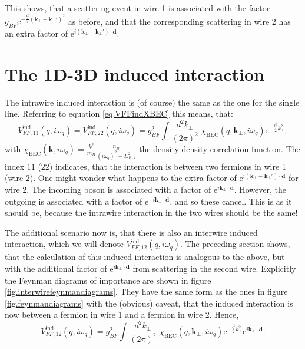This shows, that a scattering event in wire 1 is associated with the factor $g_{BF} \text{e}^{-\frac{l_t^2}{4}(\mathbf{k}_\perp - \mathbf{k}_\perp')^2}$ as before, and that the corresponding scattering in wire 2 has an extra factor of $\text{e}^{i(\mathbf{k}_\perp - \mathbf{k}_\perp')\cdot \mathbf{d}}$. 

\section{The 1D-3D induced interaction}
The intrawire induced interaction is (of course) the same as the one for the single line. Referring to equation \ref{eq.VFFindXBEC} this means, that:
\begin{equation}
V_{FF,11}^\text{ind}(q,i\omega_q) = V_{FF,22}^\text{ind}(q,i\omega_q) = g_{BF}^2\int\frac{d^2k_\perp}{(2\pi)^2}\; \chi_\text{BEC}(q,\mathbf{k}_\perp,i\omega_q)\text{e}^{-\frac{l_t^2}{2}k_\perp^2}, 
\label{eq.VFF1122indXBEC} 
\end{equation}
with $\chi_\text{BEC}(\mathbf{k},i\omega_q) = \frac{k^2}{m_B}\frac{n_B}{(i\omega_q)^2-E_{B,k}^2}$ the density-density correlation function. The index $11$ ($22$) indicates, that the interaction is between two fermions in wire 1 (wire 2). One might wonder what happens to the extra factor of $\text{e}^{i(\mathbf{k}_\perp - \mathbf{k}_\perp')\cdot \mathbf{d}}$ for wire 2. The incoming boson is associated with a factor of $\text{e}^{i\mathbf{k}_\perp\cdot \mathbf{d}}$. However, the outgoing is associated with a factor of $\text{e}^{-i\mathbf{k}_\perp\cdot \mathbf{d}}$, and so these cancel. This is as it should be, because the intrawire interaction in the two wires should be the same!

The additional scenario now is, that there is also an interwire induced interaction, which we will denote $V_{FF,12}^\text{ind}(q,i\omega_q)$. The preceding section shows, that the calculation of this induced interaction is analogous to the above, but with the additional factor of $\text{e}^{i\mathbf{k}_\perp\cdot \mathbf{d}}$ from scattering in the second wire. Explicitly the Feynman diagrams of importance are shown in figure \ref{fig.interwirefeynmandiagrams}. They have the same form as the ones in figure \ref{fig.feynmandiagrams} with the (obvious) caveat, that the induced interaction is now between a fermion in wire 1 and a fermion in wire 2. Hence,
\begin{equation}
V_{FF,12}^\text{ind}(q,i\omega_q) = g_{BF}^2\int\frac{d^2k_\perp}{(2\pi)^2}\; \chi_\text{BEC}(q,\mathbf{k}_\perp,i\omega_q)\text{e}^{-\frac{l_t^2}{2}k_\perp^2}\text{e}^{i\mathbf{k}_\perp\cdot \mathbf{d}}. 
\label{eq.VFF12indXBEC} 
\end{equation}

